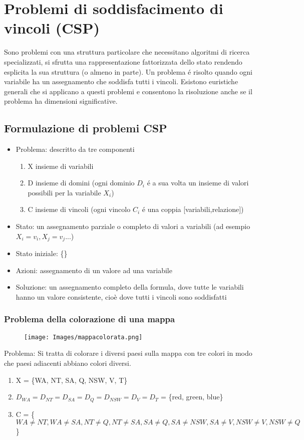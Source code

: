 \documentclass{article}
\begin{document}
\section{Problemi di soddisfacimento di vincoli (CSP)}
Sono problemi con una struttura particolare che necessitano algoritmi di ricerca specializzati, si sfrutta una rappresentazione fattorizzata dello stato rendendo esplicita la sua struttura (o almeno in parte). Un problema é risolto quando ogni variabile ha un assegnamento che soddisfa tutti i vincoli. Esistono euristiche generali che si applicano a questi problemi e consentono la risoluzione anche se il problema ha dimensioni significative.
\subsection{Formulazione di problemi CSP}
\begin{itemize}
    \item Problema: descritto da tre componenti
        \begin{enumerate}
        \item X insieme di variabili
        \item D insieme di domini (ogni dominio $D_i$ é a sua volta un insieme di valori possibili per la variabile $X_i$)
        \item C insieme di vincoli (ogni vincolo $C_i$ é una coppia [variabili,relazione])
        \end{enumerate}
    \item Stato: un assegnamento parziale o completo di valori a variabili (ad esempio $X_i = v_i, X_j = v_j$...)
    \item Stato iniziale: \{\}
    \item Azioni: assegnamento di un valore ad una variabile
    \item Soluzione: un assegnamento completo della formula, dove tutte le variabili hanno un valore consistente, cioè dove tutti i vincoli sono soddisfatti
\end{itemize}

\subsubsection{Problema della colorazione di una mappa}
\begin{figure}[H]
\centering
\texttt{[image: Images/mappacolorata.png]}
\end{figure}
Problema: Si tratta di colorare i diversi paesi sulla mappa con tre colori in modo che paesi adiacenti abbiano colori diversi.
\begin{enumerate}
    \item X = \{WA, NT, SA, Q, NSW, V, T\}
    \item $D_{WA} = D_{NT} = D_{SA} = D_Q = D_{NSW} = D_{V} = D_T$ = \{red, green, blue\}
    \item C = \{$WA \neq NT, WA \neq SA, NT \neq Q, NT \neq SA, SA \neq Q, SA \neq NSW, SA \neq V, NSW \neq V, NSW \neq Q$\}
\end{enumerate}
\end{document}
